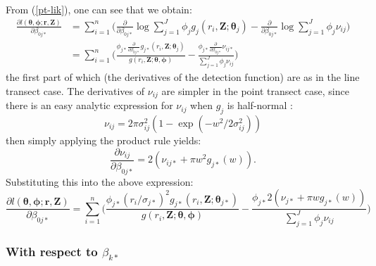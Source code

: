 \documentclass{report}
\begin{document}
From (\ref{pt-lik}), one can see that we obtain:
\begin{align*}
\frac{\partial l(\bm{\theta}, \bm{\phi}; \mathbf{r},\mathbf{Z})}{\partial \beta_{0j*}}  &= \sum_{i=1}^n \Big( \frac{\partial}{\partial \beta_{0j*}} \log \sum_{j=1}^J \phi_j g_j(r_i,\mathbf{Z}; \bm{\theta}_j) - \frac{\partial}{\partial \beta_{0j*}}\log \sum_{j=1}^J \phi_j \nu_{ij}\Big)\\
&= \sum_{i=1}^n \Big( \frac{ \phi_{j*} \frac{\partial}{\partial \beta_{0j*}}  g_{j*} (r_i,\mathbf{Z}; \bm{\theta}_j)}{g(r_i,\mathbf{Z}; \bm{\theta}, \bm{\phi})} - \frac{ \phi_{j*}\frac{\partial}{\partial \beta_{0j*}}  \nu_{ij*} }{ \sum_{j=1}^J \phi_j \nu_{ij}}\Big)
\end{align*}
the first part of which (the derivatives of the detection function) are as in the line transect case. The derivatives of $\nu_{ij}$ are simpler in the point transect case, since there is an easy analytic expression for $\nu_{ij}$ when $g_j$ is half-normal :
\begin{equation*}
\nu_{ij} = 2 \pi \sigma_{ij}^2 (1-\exp (-w^2/2\sigma_{ij}^2 ))
\end{equation*}
then simply applying the product rule yields:
\begin{equation*}
\frac{\partial \nu_{ij}}{\partial \beta_{0j*}} = 2 (\nu_{ij*} + \pi w^2 g_{j*}(w)).
\end{equation*}
Substituting this into the above expression:
\begin{equation*}
\frac{\partial l(\bm{\theta}, \bm{\phi}; \mathbf{r},\mathbf{Z})}{\partial \beta_{0j*}}  = \sum_{i=1}^n \Big( \frac{ \phi_{j*} (r_i/\sigma_{j*})^2 g_{j*}(r_i,\mathbf{Z}; \bm{\theta}_{j*})}{g(r_i,\mathbf{Z}; \bm{\theta}, \bm{\phi})} - \frac{ \phi_{j*} 2 (\nu_{j*} + \pi w g_{j*}(w)) }{ \sum_{j=1}^J \phi_j \nu_{ij}}\Big)
\end{equation*}

\subsubsection*{With respect to $\beta_{k*}$}
\end{document}
